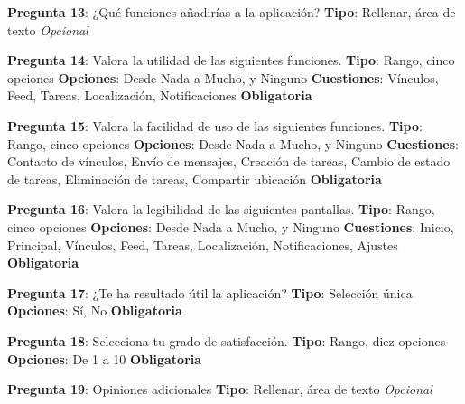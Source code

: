 \textbf{Pregunta 13}: ¿Qué funciones añadirías a la aplicación?\newline
\textbf{Tipo}: Rellenar, área de texto\newline
\emph{Opcional}

\textbf{Pregunta 14}: Valora la utilidad de las siguientes funciones.\newline
\textbf{Tipo}: Rango, cinco opciones\newline
\textbf{Opciones}: Desde Nada a Mucho, y Ninguno\newline
\textbf{Cuestiones}: Vínculos, Feed, Tareas, Localización, Notificaciones
\textbf{Obligatoria}

\textbf{Pregunta 15}: Valora la facilidad de uso de las siguientes funciones.\newline
\textbf{Tipo}: Rango, cinco opciones\newline
\textbf{Opciones}: Desde Nada a Mucho, y Ninguno\newline
\textbf{Cuestiones}: Contacto de vínculos, Envío de mensajes, Creación de tareas, Cambio de estado de tareas, Eliminación de tareas, Compartir ubicación\newline
\textbf{Obligatoria}

\textbf{Pregunta 16}: Valora la legibilidad de las siguientes pantallas.\newline
\textbf{Tipo}: Rango, cinco opciones\newline
\textbf{Opciones}: Desde Nada a Mucho, y Ninguno\newline
\textbf{Cuestiones}: Inicio, Principal, Vínculos, Feed, Tareas, Localización, Notificaciones, Ajustes\newline
\textbf{Obligatoria}

\textbf{Pregunta 17}: ¿Te ha resultado útil la aplicación?\newline
\textbf{Tipo}: Selección única \newline
\textbf{Opciones}: Sí, No\newline
\textbf{Obligatoria}

\newpage

\textbf{Pregunta 18}: Selecciona tu grado de satisfacción.\newline
\textbf{Tipo}: Rango, diez opciones\newline
\textbf{Opciones}: De 1 a 10\newline
\textbf{Obligatoria}

\textbf{Pregunta 19}: Opiniones adicionales\newline
\textbf{Tipo}: Rellenar, área de texto\newline
\emph{Opcional}